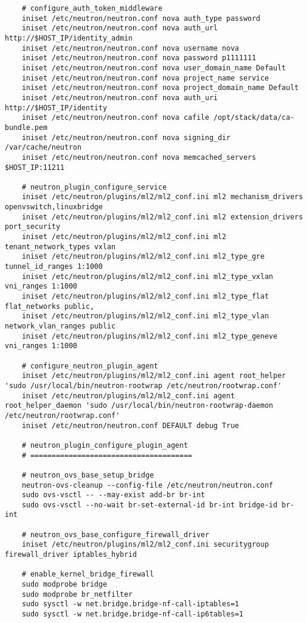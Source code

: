 \documentclass[a4paper,left=1.5cm,right=1.5cm,11pt]{article}
\begin{document}
\begin{lstlisting}
	# configure_auth_token_middleware
	iniset /etc/neutron/neutron.conf nova auth_type password
	iniset /etc/neutron/neutron.conf nova auth_url http://$HOST_IP/identity_admin
	iniset /etc/neutron/neutron.conf nova username nova
	iniset /etc/neutron/neutron.conf nova password p1111111
	iniset /etc/neutron/neutron.conf nova user_domain_name Default
	iniset /etc/neutron/neutron.conf nova project_name service
	iniset /etc/neutron/neutron.conf nova project_domain_name Default
	iniset /etc/neutron/neutron.conf nova auth_uri http://$HOST_IP/identity
	iniset /etc/neutron/neutron.conf nova cafile /opt/stack/data/ca-bundle.pem
	iniset /etc/neutron/neutron.conf nova signing_dir /var/cache/neutron
	iniset /etc/neutron/neutron.conf nova memcached_servers $HOST_IP:11211

	# neutron_plugin_configure_service
	iniset /etc/neutron/plugins/ml2/ml2_conf.ini ml2 mechanism_drivers openvswitch,linuxbridge
	iniset /etc/neutron/plugins/ml2/ml2_conf.ini ml2 extension_drivers port_security
	iniset /etc/neutron/plugins/ml2/ml2_conf.ini ml2 tenant_network_types vxlan
	iniset /etc/neutron/plugins/ml2/ml2_conf.ini ml2_type_gre tunnel_id_ranges 1:1000
	iniset /etc/neutron/plugins/ml2/ml2_conf.ini ml2_type_vxlan vni_ranges 1:1000
	iniset /etc/neutron/plugins/ml2/ml2_conf.ini ml2_type_flat flat_networks public,
	iniset /etc/neutron/plugins/ml2/ml2_conf.ini ml2_type_vlan network_vlan_ranges public
	iniset /etc/neutron/plugins/ml2/ml2_conf.ini ml2_type_geneve vni_ranges 1:1000

	# configure_neutron_plugin_agent
	iniset /etc/neutron/plugins/ml2/ml2_conf.ini agent root_helper 'sudo /usr/local/bin/neutron-rootwrap /etc/neutron/rootwrap.conf'
	iniset /etc/neutron/plugins/ml2/ml2_conf.ini agent root_helper_daemon 'sudo /usr/local/bin/neutron-rootwrap-daemon /etc/neutron/rootwrap.conf'
	iniset /etc/neutron/neutron.conf DEFAULT debug True

	# neutron_plugin_configure_plugin_agent
	# ======================================

	# neutron_ovs_base_setup_bridge
	neutron-ovs-cleanup --config-file /etc/neutron/neutron.conf
	sudo ovs-vsctl -- --may-exist add-br br-int
	sudo ovs-vsctl --no-wait br-set-external-id br-int bridge-id br-int
	
	# neutron_ovs_base_configure_firewall_driver
	iniset /etc/neutron/plugins/ml2/ml2_conf.ini securitygroup firewall_driver iptables_hybrid
	
	# enable_kernel_bridge_firewall
	sudo modprobe bridge
	sudo modprobe br_netfilter
	sudo sysctl -w net.bridge.bridge-nf-call-iptables=1
	sudo sysctl -w net.bridge.bridge-nf-call-ip6tables=1


\end{lstlisting}
\end{document}
